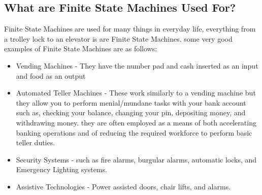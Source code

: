 \documentclass{article}
\begin{document}
\subsection{What are Finite State Machines Used For?}
Finite State Machines are used for many things in everyday life, everything from a trolley lock to an elevator is are Finite State Machines. some very good examples of Finite State Machines are as follows:
\begin{itemize}
	\item Vending Machines - They have the number pad and cash inserted as an input and food as an output 
	\item Automated Teller Machines - These work similarly to a vending machine but they allow you to perform menial/mundane tasks with your bank account such as, checking your balance, changing your pin, depositing money, and withdrawing money. they are often employed as a means of both accelerating banking operations and of reducing the required workforce to perform basic teller duties.
	\item Security Systems - such as fire alarms, burgular alarms, automatic locks, and Emergency Lighting systems.
	\item Assistive Technologies - Power assisted doors, chair lifts, and alarms. 
\end {itemize}
\end{document}
